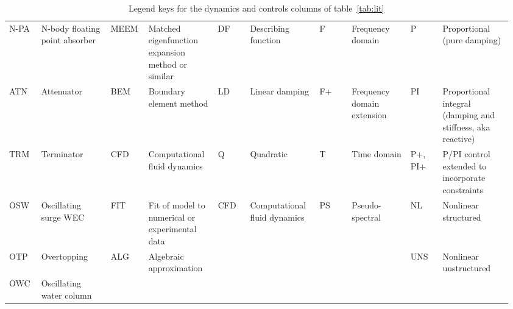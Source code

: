 \begin{longtable}


\hline 
\caption{Comparison of the disciplinary scope and modeling fidelity of previous WEC models used for optimization}
\label{tab:lit}
\end{longtable}

\begin{landscape}
\begingroup
\begin{table}
    \centering
    \begin{tabular}{
        >{\centering\arraybackslash}p{0.065\linewidth}
        >{\raggedright\arraybackslash}p{0.13\linewidth}|
        >{\centering\arraybackslash}p{0.065\linewidth}
        >{\raggedright\arraybackslash}p{0.13\linewidth}|
        >{\centering\arraybackslash}p{0.065\linewidth}
        >{\raggedright\arraybackslash}p{0.13\linewidth}|
        >{\centering\arraybackslash}p{0.065\linewidth}
        >{\raggedright\arraybackslash}p{0.11\linewidth}|
        >{\centering\arraybackslash}p{0.065\linewidth}
        >{\raggedright\arraybackslash}p{0.13\linewidth}}
         \multicolumn{2}{c|}{Device}&  \multicolumn{2}{c|}{Hydro}&  \multicolumn{2}{c|}{Drag} &\multicolumn{2}{c|}{Domain} & \multicolumn{2}{c}{Controls} \\ \hline
         N-PA&  N-body floating point absorber&  MEEM&  Matched eigenfunction expansion method or similar &  DF& Describing function & F&Frequency domain & P&Proportional (pure damping) \\
         ATN&  Attenuator&  BEM&  Boundary element method&  LD& Linear damping & F+&Frequency domain extension & PI&Proportional integral (damping and stiffness, aka reactive) \\
         TRM&  Terminator&  CFD&  Computational fluid dynamics&  Q& Quadratic & T&Time domain & P+, PI+&P/PI control extended to incorporate constraints \\
         OSW&  Oscillating surge WEC&  FIT&  Fit of model to numerical or experimental data&  CFD& Computational fluid dynamics & PS&Pseudo-spectral& NL&Nonlinear structured \\
         OTP&  Overtopping&  ALG&  Algebraic approximation&  &  & & & UNS&Nonlinear unstructured \\
        OWC& Oscillating water column& & & & & & & & \\
    \end{tabular}
    \caption{Legend keys for the dynamics and controls columns of table~\ref{tab:lit}}
    \label{tab:lit-review-legend-dynam}
\end{table}
\endgroup
\end{landscape}

